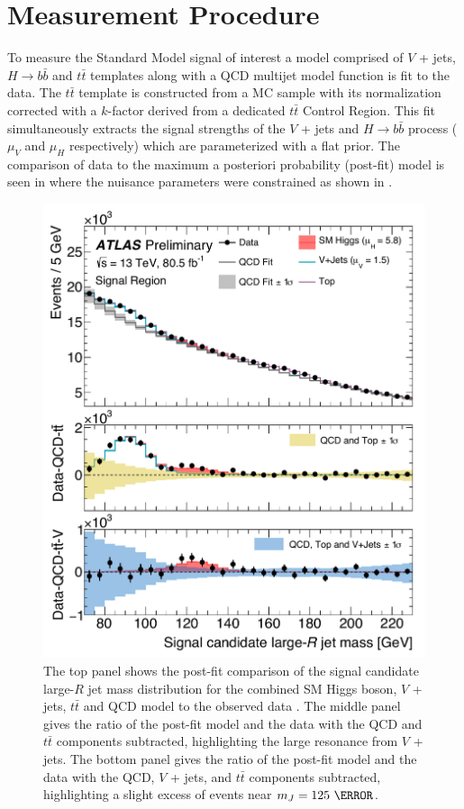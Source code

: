 \section{Measurement Procedure} \label{sec:results:procedure}

To measure the Standard Model signal of interest a model comprised of $V$ +
jets, $H \rightarrow b\bar{b}$ and $t\bar{t}$ templates along with a QCD
multijet model function is fit to the data. The $t\bar{t}$ template is
constructed from a MC sample with its normalization corrected with a $k$-factor
derived from a dedicated $t\bar{t}$ Control Region. This fit simultaneously
extracts the signal strengths of the $V$ + jets and $H \rightarrow b\bar{b}$
process ($\mu_{V}$ and $\mu_{H}$ respectively) which are parameterized with a
flat prior. The comparison of data to the maximum a posteriori probability
(post-fit) model is seen in  where the nuisance
parameters were constrained as shown in .

\begin{figure}
\centering
\includegraphics[width=\linewidth]{figures/results/money_plot}
\caption{ 
The top panel shows the post-fit comparison of the signal candidate large-$R$
jet mass distribution for the combined SM Higgs boson, $V$ + jets, $t\bar{t}$
and QCD model to the observed data \cite{ATLAS-CONF-2018-052}.  The middle
panel gives the ratio of the post-fit model and the data with the QCD and
$t\bar{t}$ components subtracted, highlighting the large resonance from $V$ +
jets.  The bottom panel gives the ratio of the post-fit model and the data with
the QCD, $V$ + jets, and $t\bar{t}$ components subtracted, highlighting a
slight excess of events near $m_{J} = 125~\GeV$.}
\label{sec:results:money_plot}
\end{figure}

